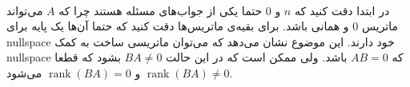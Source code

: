 \\
در ابتدا دقت کنید که
$n$
و 0
حتما یکی از جواب‌های مسئله هستند چرا که
$A$
می‌تواند ماتریس 0 و همانی باشد.
برای بقیه‌ی ماتریس‌ها دقت کنید که حتما آن‌ها یک پایه برای
nullspace
خود دارند. این موضوع نشان می‌دهد که می‌توان ماتریسی ساخت به کمک
nullspace
که
$AB = 0$
باشد. ولی ممکن است که در این حالت
$BA \neq 0$
بشود که قطعا
$\operatorname{rank}(BA) \neq 0$
و
$\operatorname{rank}(BA) = 0$
می‌شود.


